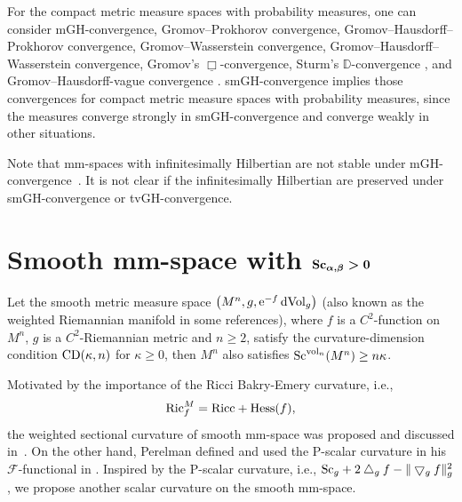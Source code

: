 \documentclass[pdftex]{sigma}
\begin{document}
\begin{Remark}
For the compact metric measure spaces with probability measures, one can consider mGH-convergence, Gromov--Prokhorov convergence, Gromov--Hausdorff--Prokhorov convergence, Gromov--Wasserstein convergence, Gromov--Hausdorff--Wasserstein convergence, Gromov's
$\underline{\Box}$-convergence, Sturm's $\mathbb{D}$-convergence \cite[Section~27]{MR2459454}, and Gromov--Hausdorff-vague convergence \cite{MR3522292}. smGH-convergence implies those convergences for compact metric measure spaces with probability measures, since the measures converge strongly in smGH-convergence and converge weakly in other situations.

Note that mm-spaces with infinitesimally Hilbertian are not stable under mGH-conver\-gen\-ce~\cite{MR3381131}. It is not clear if the infinitesimally Hilbertian are preserved under smGH-convergence or tvGH-convergence.
\end{Remark}

\section[Smooth mm-space with Sc(alpha,beta)>0]{Smooth mm-space with $\boldsymbol{{\rm Sc}_{\alpha, \beta}>0}$}\label{smooth mm-space}
 Let the smooth metric measure space $\big(M^n, g, {\rm e}^{-f}\,{\rm dVol}_g\big)$ (also known as the weighted Riemannian manifold in some references), where $f$ is a $C^2$-function on $M^n$, $g$ is a $C^2$-Riemannian metric and $n \geq 2$, satisfy the curvature-dimension condition ${\rm CD}(\kappa, n)$ for $\kappa\geq 0$, then $M^n$ also satisfies ${\rm Sc}^{{\rm vol}_n}(M^n)\geq n\kappa$.

 Motivated by the importance of the Ricci Bakry-Emery curvature, i.e.,
 \begin{gather*}
 {\rm Ric}^M_f= {\rm Ricc} +{\rm Hess}(f),
 \end{gather*}
 the weighted sectional curvature of smooth mm-space was proposed and discussed in~\cite{MR3397488}. On the other hand, Perelman defined and used the P-scalar curvature in his $\mathcal{F}$-functional in \cite[Section~1]{2002math.....11159P}. Inspired by the P-scalar curvature, i.e., $ {\rm Sc}_g + 2\bigtriangleup_gf - \|\bigtriangledown_gf\|^2_g$, we propose another scalar curvature on the smooth mm-space.
\end{document}
